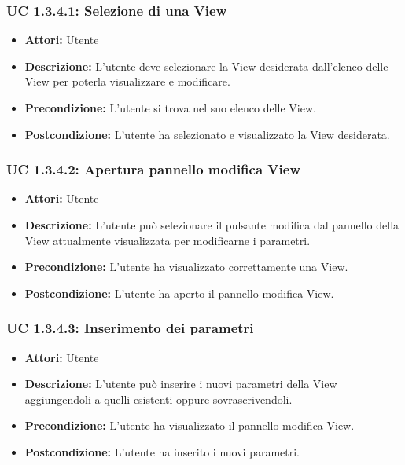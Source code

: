 \subsubsection{UC 1.3.4.1: Selezione di una View}

\begin{itemize}
    \item \textbf{Attori:} Utente
    \item \textbf{Descrizione:} L'utente deve selezionare la View desiderata dall'elenco delle View per poterla visualizzare e modificare.
    \item \textbf{Precondizione:} L'utente si trova nel suo elenco delle View.
    \item \textbf{Postcondizione:} L'utente ha selezionato e visualizzato la View desiderata.
\end{itemize}

\subsubsection{UC 1.3.4.2: Apertura pannello modifica View}

\begin{itemize}
    \item \textbf{Attori:} Utente
    \item \textbf{Descrizione:} L'utente può selezionare il pulsante modifica dal pannello della View attualmente visualizzata per modificarne i parametri.
    \item \textbf{Precondizione:} L'utente ha visualizzato correttamente una View.
    \item \textbf{Postcondizione:} L'utente ha aperto il pannello modifica View.
\end{itemize}

\subsubsection{UC 1.3.4.3: Inserimento dei parametri}

\begin{itemize}
    \item \textbf{Attori:} Utente
    \item \textbf{Descrizione:} L'utente può inserire i nuovi parametri della View aggiungendoli a quelli esistenti oppure sovrascrivendoli.
    \item \textbf{Precondizione:} L'utente ha visualizzato il pannello modifica View.
    \item \textbf{Postcondizione:} L'utente ha inserito i nuovi parametri.
\end{itemize}

